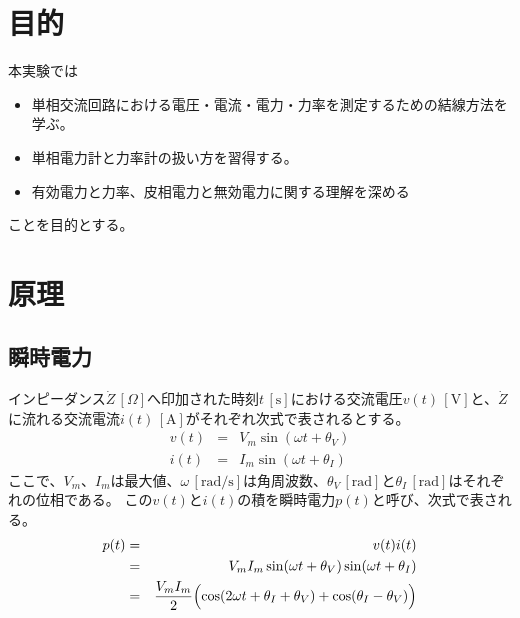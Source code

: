 \documentclass[11pt,dvipdfmx]{jarticle}
\begin{document}
\begin{jikkenTitle}
 \subTitle{} %
 \kyoudouII{} %
 \yoteibi{/ 　}%
 \yoteibiII{}%
 \yoteibiIII{}%
 \hanNumberName{}{}{} %
\end{jikkenTitle}

\section{目的}
本実験では
\begin{itemize}
	\item 単相交流回路における電圧・電流・電力・力率を測定するための結線方法を学ぶ。
	\item 単相電力計と力率計の扱い方を習得する。
	\item 有効電力と力率、皮相電力と無効電力に関する理解を深める
\end{itemize}
ことを目的とする。

\section{原理}
\subsection{瞬時電力}
インピーダンス$\dot{Z}\,[\Omega]$へ印加された時刻$t\,[\mathrm{s}]$における交流電圧$v(t)\,[\mathrm{V}]$と、$\dot{Z}$に流れる交流電流$i(t)\,[\mathrm{A}]$がそれぞれ次式で表されるとする。
\begin{eqnarray}
	v(t) &=& V_m\sin(\omega t+\theta_V)\\
	i(t) &=& I_m\sin(\omega t + \theta_I)
\end{eqnarray}
ここで、$V_m$、$I_m$は最大値、$\omega\,[\mathrm{rad/s}]$は角周波数、$\theta_V\,[\mathrm{rad}]$と$\theta_I\,[\mathrm{rad}]$はそれぞれの位相である。
この$v(t)$と$i(t)$の積を瞬時電力$p(t)$と呼び、次式で表される。
\begin{eqnarray}
	p(t)&=& v(t)i(t)\nonumber\\
	&=&V_mI_m\sin(\omega t+\theta_V)\sin(\omega t + \theta_I)\nonumber\\
	&=& \frac{V_mI_m}{2}\Bigl(\cos(2\omega t + \theta_I+\theta_V)+\cos(\theta_I - \theta_V)\Bigr)
	\label{eq:ip}
\end{eqnarray}
\end{document}
